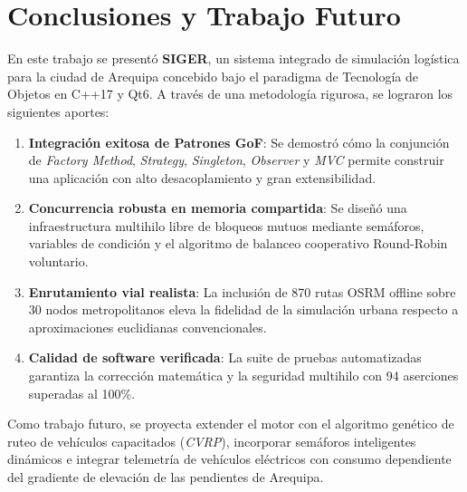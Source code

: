 \documentclass[conference]{IEEEtran}
\begin{document}
\section{Conclusiones y Trabajo Futuro}
En este trabajo se presentó \textbf{SIGER}, un sistema integrado de simulación logística para la ciudad de Arequipa concebido bajo el paradigma de Tecnología de Objetos en C++17 y Qt6. A través de una metodología rigurosa, se lograron los siguientes aportes:
\begin{enumerate}
    \item \textbf{Integración exitosa de Patrones GoF}: Se demostró cómo la conjunción de \textit{Factory Method}, \textit{Strategy}, \textit{Singleton}, \textit{Observer} y \textit{MVC} permite construir una aplicación con alto desacoplamiento y gran extensibilidad.
    \item \textbf{Concurrencia robusta en memoria compartida}: Se diseñó una infraestructura multihilo libre de bloqueos mutuos mediante semáforos, variables de condición y el algoritmo de balanceo cooperativo Round-Robin voluntario.
    \item \textbf{Enrutamiento vial realista}: La inclusión de 870 rutas OSRM offline sobre 30 nodos metropolitanos eleva la fidelidad de la simulación urbana respecto a aproximaciones euclidianas convencionales.
    \item \textbf{Calidad de software verificada}: La suite de pruebas automatizadas garantiza la corrección matemática y la seguridad multihilo con 94 aserciones superadas al 100\%.
\end{enumerate}

Como trabajo futuro, se proyecta extender el motor con el algoritmo genético de ruteo de vehículos capacitados (\textit{CVRP}), incorporar semáforos inteligentes dinámicos e integrar telemetría de vehículos eléctricos con consumo dependiente del gradiente de elevación de las pendientes de Arequipa.
\end{document}

